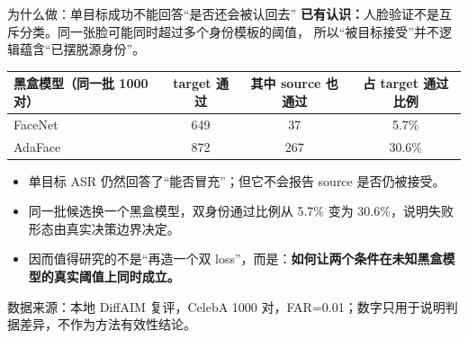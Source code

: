 \begin{frame}{为什么做：单目标成功不能回答“是否还会被认回去”}
  \small
  \textbf{已有认识：}人脸验证不是互斥分类。同一张脸可能同时超过多个身份模板的阈值，
  所以“被目标接受”并不逻辑蕴含“已摆脱源身份”。

  \vspace{0.4em}
  \centering
  \setlength{\tabcolsep}{7pt}\renewcommand{\arraystretch}{1.1}
  \begin{tabular}{lccc}
    \toprule
    黑盒模型（同一批 1000 对） & target 通过 & 其中 source 也通过 & 占 target 通过比例 \\
    \midrule
    FaceNet & 649 & 37 & 5.7\% \\
    AdaFace & 872 & 267 & 30.6\% \\
    \bottomrule
  \end{tabular}

  \vspace{0.5em}
  \raggedright
  \begin{itemize}\setlength{\itemsep}{3pt}
    \item 单目标 ASR 仍然回答了“能否冒充”；但它不会报告 source 是否仍被接受。
    \item 同一批候选换一个黑盒模型，双身份通过比例从 5.7\% 变为 30.6\%，说明失败形态由真实决策边界决定。
    \item 因而值得研究的不是“再造一个双 loss”，而是：\textbf{如何让两个条件在未知黑盒模型的真实阈值上同时成立。}
  \end{itemize}

  \vspace{0.2em}
  {\scriptsize 数据来源：本地 DiffAIM 复评，CelebA 1000 对，FAR=0.01；数字只用于说明判据差异，不作为方法有效性结论。}
\end{frame}

